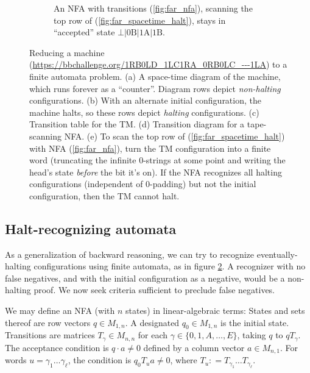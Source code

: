 \begin{figure}
\begin{subfigure}{\textwidth}
    \caption{An NFA with transitions (\ref{fig:far_nfa}), scanning the top row of (\ref{fig:far_spacetime_halt}), stays in ``accepted'' state
      $\bot|\textrm{0B}|\textrm{1A}|\textrm{1B}$.}
    \label{fig:far_scan}
  \end{subfigure}

  \caption{Reducing a machine (\url{https://bbchallenge.org/1RB0LD_1LC1RA_0RB0LC_---1LA}) to a finite automata problem.
    (a) A space-time diagram of the machine, which runs forever as a ``counter''. Diagram rows depict \emph{non-halting} configurations.
    (b) With an alternate initial configuration, the machine halts, so these rows depict \emph{halting} configurations.
    (c) Transition table for the TM.
    (d) Transition diagram for a tape-scanning NFA.
    (e) To scan the top row of (\ref{fig:far_spacetime_halt}) with NFA (\ref{fig:far_nfa}), turn the TM configuration into a finite word
        (truncating the infinite 0-strings at some point and writing the head's state \emph{before} the bit it's on).
        If the NFA recognizes all halting configurations (independent of 0-padding) but not the initial configuration, then the TM cannot halt.}
  \label{fig:finite-automata-reduction}
\end{figure}


\subsection{Halt-recognizing automata}
\label{far-defs-recognizer}
As a generalization of backward reasoning, we can try to recognize eventually-halting configurations using finite automata, as in figure \ref{fig:finite-automata-reduction}.
A recognizer with no false negatives, and with the initial configuration as a negative, would be a non-halting proof.
We now seek criteria sufficient to preclude false negatives.

We may define an NFA (with $n$ states) in linear-algebraic terms:
States and sets thereof are row vectors $q\in M_{1,n}$.
A designated $q_0\in M_{1,n}$ is the initial state.
Transitions are matrices $T_\gamma\in M_{n,n}$ for each $\gamma\in\{0,1,A,\ldots,E\}$, taking $q$ to $qT_\gamma$.
The acceptance condition is $q\cdot a\ne 0$ defined by a column vector $a\in M_{n,1}$.
For words $u=\gamma_1\dots\gamma_\ell$, the condition is $q_0 T_u a\ne 0$, where $T_u\mathrel{\mathop:}=T_{\gamma_1}\dots T_{\gamma_\ell}$.

